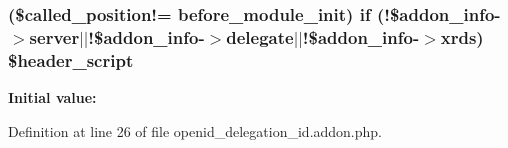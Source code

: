 \subsubsection[{\texorpdfstring{\$header\+\_\+script}{$header_script}}]{ (\$called\+\_\+position!= \textquotesingle{}before\+\_\+module\+\_\+init\textquotesingle{}) {\bf if} (!\$addon\+\_\+info-\/$>$server$\vert$$\vert$!\$addon\+\_\+info-\/$>$delegate$\vert$$\vert$!\$addon\+\_\+info-\/$>$xrds) \$header\+\_\+script}\hypertarget{openid__delegation__id_8addon_8php_aee516fc492038096250a555b5f8bc880}{}\label{openid__delegation__id_8addon_8php_aee516fc492038096250a555b5f8bc880}
{\bfseries Initial value\+:}


Definition at line 26 of file openid\+\_\+delegation\+\_\+id.\+addon.\+php.

